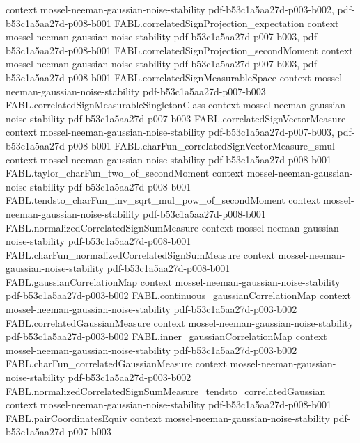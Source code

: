 \begin{theorem}
  {context}
  {mossel-neeman-gaussian-noise-stability}
  {pdf-b53c1a5aa27d-p003-b002,
    pdf-b53c1a5aa27d-p008-b001}
\proofstep
  {FABL.correlatedSignProjection_expectation}
  {context}
  {mossel-neeman-gaussian-noise-stability}
  {pdf-b53c1a5aa27d-p007-b003,
    pdf-b53c1a5aa27d-p008-b001}
\proofstep
  {FABL.correlatedSignProjection_secondMoment}
  {context}
  {mossel-neeman-gaussian-noise-stability}
  {pdf-b53c1a5aa27d-p007-b003,
    pdf-b53c1a5aa27d-p008-b001}
\proofstep
  {FABL.correlatedSignMeasurableSpace}
  {context}
  {mossel-neeman-gaussian-noise-stability}
  {pdf-b53c1a5aa27d-p007-b003}
\proofstep
  {FABL.correlatedSignMeasurableSingletonClass}
  {context}
  {mossel-neeman-gaussian-noise-stability}
  {pdf-b53c1a5aa27d-p007-b003}
\proofstep
  {FABL.correlatedSignVectorMeasure}
  {context}
  {mossel-neeman-gaussian-noise-stability}
  {pdf-b53c1a5aa27d-p007-b003,
    pdf-b53c1a5aa27d-p008-b001}
\proofstep
  {FABL.charFun_correlatedSignVectorMeasure_smul}
  {context}
  {mossel-neeman-gaussian-noise-stability}
  {pdf-b53c1a5aa27d-p008-b001}
\proofstep
  {FABL.taylor_charFun_two_of_secondMoment}
  {context}
  {mossel-neeman-gaussian-noise-stability}
  {pdf-b53c1a5aa27d-p008-b001}
\proofstep
  {FABL.tendsto_charFun_inv_sqrt_mul_pow_of_secondMoment}
  {context}
  {mossel-neeman-gaussian-noise-stability}
  {pdf-b53c1a5aa27d-p008-b001}
\proofstep
  {FABL.normalizedCorrelatedSignSumMeasure}
  {context}
  {mossel-neeman-gaussian-noise-stability}
  {pdf-b53c1a5aa27d-p008-b001}
\proofstep
  {FABL.charFun_normalizedCorrelatedSignSumMeasure}
  {context}
  {mossel-neeman-gaussian-noise-stability}
  {pdf-b53c1a5aa27d-p008-b001}
\proofstep
  {FABL.gaussianCorrelationMap}
  {context}
  {mossel-neeman-gaussian-noise-stability}
  {pdf-b53c1a5aa27d-p003-b002}
\proofstep
  {FABL.continuous_gaussianCorrelationMap}
  {context}
  {mossel-neeman-gaussian-noise-stability}
  {pdf-b53c1a5aa27d-p003-b002}
\proofstep
  {FABL.correlatedGaussianMeasure}
  {context}
  {mossel-neeman-gaussian-noise-stability}
  {pdf-b53c1a5aa27d-p003-b002}
\proofstep
  {FABL.inner_gaussianCorrelationMap}
  {context}
  {mossel-neeman-gaussian-noise-stability}
  {pdf-b53c1a5aa27d-p003-b002}
\proofstep
  {FABL.charFun_correlatedGaussianMeasure}
  {context}
  {mossel-neeman-gaussian-noise-stability}
  {pdf-b53c1a5aa27d-p003-b002}
\proofstep
  {FABL.normalizedCorrelatedSignSumMeasure_tendsto_correlatedGaussian}
  {context}
  {mossel-neeman-gaussian-noise-stability}
  {pdf-b53c1a5aa27d-p008-b001}
\proofstep
  {FABL.pairCoordinatesEquiv}
  {context}
  {mossel-neeman-gaussian-noise-stability}
  {pdf-b53c1a5aa27d-p007-b003}

\end{theorem}
